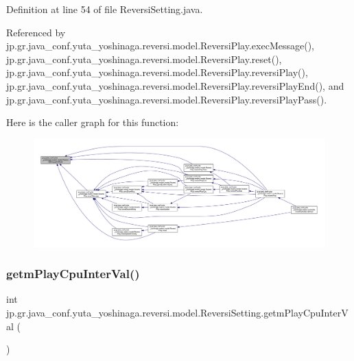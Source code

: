 Definition at line 54 of file Reversi\+Setting.\+java.



Referenced by jp.\+gr.\+java\+\_\+conf.\+yuta\+\_\+yoshinaga.\+reversi.\+model.\+Reversi\+Play.\+exec\+Message(), jp.\+gr.\+java\+\_\+conf.\+yuta\+\_\+yoshinaga.\+reversi.\+model.\+Reversi\+Play.\+reset(), jp.\+gr.\+java\+\_\+conf.\+yuta\+\_\+yoshinaga.\+reversi.\+model.\+Reversi\+Play.\+reversi\+Play(), jp.\+gr.\+java\+\_\+conf.\+yuta\+\_\+yoshinaga.\+reversi.\+model.\+Reversi\+Play.\+reversi\+Play\+End(), and jp.\+gr.\+java\+\_\+conf.\+yuta\+\_\+yoshinaga.\+reversi.\+model.\+Reversi\+Play.\+reversi\+Play\+Pass().

Here is the caller graph for this function\+:
\nopagebreak
\begin{figure}[H]
\begin{center}
\leavevmode
\includegraphics[width=350pt]{classjp_1_1gr_1_1java__conf_1_1yuta__yoshinaga_1_1reversi_1_1model_1_1_reversi_setting_a692b0ca2802f35aa7404c38bfe2fdb02_icgraph}
\end{center}
\end{figure}
\mbox{\label{classjp_1_1gr_1_1java__conf_1_1yuta__yoshinaga_1_1reversi_1_1model_1_1_reversi_setting_acb1d20bc2dde58ec73e17bbe960cd218}} 
\subsubsection{\texorpdfstring{getm\+Play\+Cpu\+Inter\+Val()}{getmPlayCpuInterVal()}}
{\footnotesize\ttfamily int jp.\+gr.\+java\+\_\+conf.\+yuta\+\_\+yoshinaga.\+reversi.\+model.\+Reversi\+Setting.\+getm\+Play\+Cpu\+Inter\+Val (\begin{DoxyParamCaption}{ }\end{DoxyParamCaption})}



